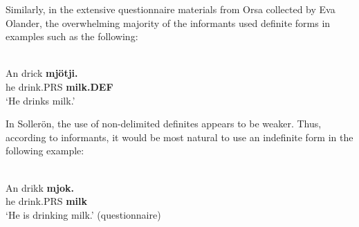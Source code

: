
\ea 
	\z 
\z

Similarly, in the extensive questionnaire materials from Orsa collected by Eva Olander, the overwhelming majority of the informants used definite forms in examples such as the following:


\ea \label{} 
\\
\gll An  drick  \textbf{mjötji.}\\
he  drink.PRS  \textbf{milk.DEF}\\
\glt ‘He drinks milk.’

\z

In Sollerön, the use of non-delimited definites appears to be weaker. Thus, according to informants, it would be most natural to use an indefinite form in the following example:


\ea \label{} 
\\
\gll An  drikk  \textbf{mjok.}\\
he  drink.PRS  \textbf{milk}\\
\glt ‘He is drinking milk.’ (questionnaire)

